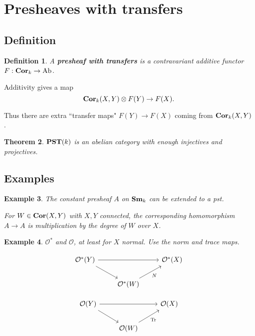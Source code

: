 \documentclass[a4paper, 11pt]{article} %
\newtheorem{theorem}{Theorem}[section]
\newtheorem{definition}[theorem]{Definition}
\newtheorem{example}[theorem]{Example}
\theoremstyle{remark}
\newcommand{\?}{{\color{red} ???}}
\newcommand{\mc}{\mathcal}
\newcommand{\catname}[1]{{\normalfont\textbf{#1}}}
\newcommand{\Sm}{\catname{Sm}}
\newcommand{\Cor}{\catname{Cor}}
\newcommand{\PST}{\catname{PST}}
\DeclareMathOperator{\Tr}{Tr}
\DeclareMathOperator{\Ab}{Ab}
\begin{document}
\section{Presheaves with transfers} 
\subsection{Definition}
\begin{definition}
A \textbf{presheaf with transfers} is a contravariant additive functor $F:\Cor_k\rightarrow\Ab$.
\end{definition} 

Additivity gives a map 
\[
\Cor_k(X, Y)\otimes F(Y)\rightarrow F(X).
\]

Thus there are extra ``transfer maps" $F(Y)\rightarrow F(X)$ coming from $\Cor_k(X, Y)$. 

\begin{theorem}
$\PST(k)$ is an abelian category with enough injectives and projectives. 
\end{theorem}

\subsection{Examples}

\begin{example}
The constant presheaf $A$ on $\Sm_k$ can be extended to a pst.  

For $W\in \Cor(X, Y)$ with $X, Y$ connected, the corresponding homomorphism $A\rightarrow A$ is multiplication by the degree of $W$ over $X$. 
\end{example}

\begin{example}
$\mc{O}^*$ and $\mc{O}$, at least for $X$ normal.  Use the norm and trace maps. 

\[\begin{tikzcd}
	{\mc{O}^*(Y)} && {\mc{O}^*(X)} \\
	& {\mc{O}^*(W)}
	\arrow[from=1-1, to=1-3]
	\arrow[from=1-1, to=2-2]
	\arrow["N"', from=2-2, to=1-3]
\end{tikzcd}\]

\[\begin{tikzcd}
	{\mc{O}(Y)} && {\mc{O}(X)} \\
	& {\mc{O}(W)}
	\arrow[from=1-1, to=1-3]
	\arrow[from=1-1, to=2-2]
	\arrow["\Tr"', from=2-2, to=1-3]
\end{tikzcd}\]
\end{example}
\end{document}
